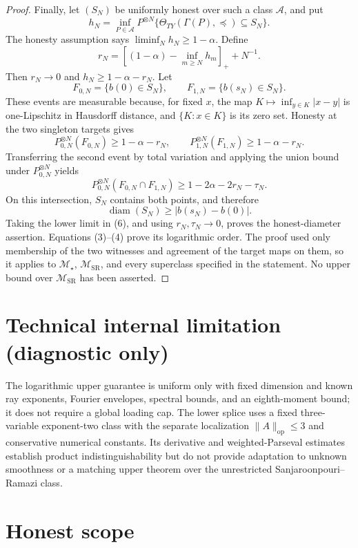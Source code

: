 \documentclass{article}
\begin{document}
\begin{proof}
Finally, let \((S_N)\) be uniformly honest over such a class \(\mathcal A\), and put
\[
 h_N=\inf_{P\in\mathcal A}P^{\otimes N}
 \{\Theta_{TY}(\Gamma(P),\preceq)\subseteq S_N\}.
\]
The honesty assumption says \(\liminf_Nh_N\ge1-\alpha\).  Define
\[
 r_N=\left[(1-\alpha)-\inf_{m\ge N}h_m\right]_++N^{-1}.
\]
Then \(r_N\to0\) and \(h_N\ge1-\alpha-r_N\).  Let
\[
 F_{0,N}=\{b(0)\in S_N\},\qquad
 F_{1,N}=\{b(s_N)\in S_N\}.
\]
These events are measurable because, for fixed \(x\), the map \(K\mapsto\inf_{y\in K}|x-y|\) is one-Lipschitz in Hausdorff distance, and \(\{K:x\in K\}\) is its zero set.  Honesty at the two singleton targets gives
\[
 P_{0,N}^{\otimes N}(F_{0,N})\ge1-\alpha-r_N,
 \qquad
 P_{1,N}^{\otimes N}(F_{1,N})\ge1-\alpha-r_N.
\]
Transferring the second event by total variation and applying the union bound under \(P_{0,N}^{\otimes N}\) yields
\[
 P_{0,N}^{\otimes N}(F_{0,N}\cap F_{1,N})
 \ge1-2\alpha-2r_N-\tau_N. \tag{6}
\]
On this intersection, \(S_N\) contains both points, and therefore
\[
 \operatorname{diam}(S_N)\ge|b(s_N)-b(0)|.
\]
Taking the lower limit in (6), and using \(r_N,\tau_N\to0\), proves the honest-diameter assertion.  Equations (3)--(4) prove its logarithmic order.  The proof used only membership of the two witnesses and agreement of the target maps on them, so it applies to \(\mathcal M_\star\), \(\mathcal M_{\mathrm{SR}}\), and every superclass specified in the statement.  No upper bound over \(\mathcal M_{\mathrm{SR}}\) has been asserted.
\end{proof}

\section*{Technical internal limitation (diagnostic only)}

The logarithmic upper guarantee is uniform only with fixed dimension and known ray exponents, Fourier envelopes, spectral bounds, and an eighth-moment bound; it does not require a global loading cap. The lower splice uses a fixed three-variable exponent-two class with the separate localization \(\|A\|_{\mathrm{op}}\le3\) and conservative numerical constants. Its derivative and weighted-Parseval estimates establish product indistinguishability but do not provide adaptation to unknown smoothness or a matching upper theorem over the unrestricted Sanjaroonpouri--Ramazi class.

\section{Honest scope}
\end{document}
